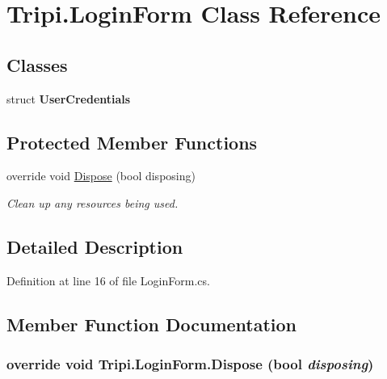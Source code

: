 \hypertarget{class_tripi_1_1_login_form}{
\section{Tripi.LoginForm Class Reference}
\label{class_tripi_1_1_login_form}
}
\subsection*{Classes}
\begin{DoxyCompactItemize}
\item 
struct {\bfseries UserCredentials}
\end{DoxyCompactItemize}
\subsection*{Protected Member Functions}
\begin{DoxyCompactItemize}
\item 
override void \hyperlink{class_tripi_1_1_login_form_a6b35b9e43ecc0a41a13c50cd888c678e}{Dispose} (bool disposing)
\begin{DoxyCompactList}\small\item\em Clean up any resources being used. \item\end{DoxyCompactList}\end{DoxyCompactItemize}


\subsection{Detailed Description}


Definition at line 16 of file LoginForm.cs.

\subsection{Member Function Documentation}
\hypertarget{class_tripi_1_1_login_form_a6b35b9e43ecc0a41a13c50cd888c678e}{
\subsubsection[{Dispose}]{\setlength{\rightskip}{0pt plus 5cm}override void Tripi.LoginForm.Dispose (bool {\em disposing})}}
\label{class_tripi_1_1_login_form_a6b35b9e43ecc0a41a13c50cd888c678e}


